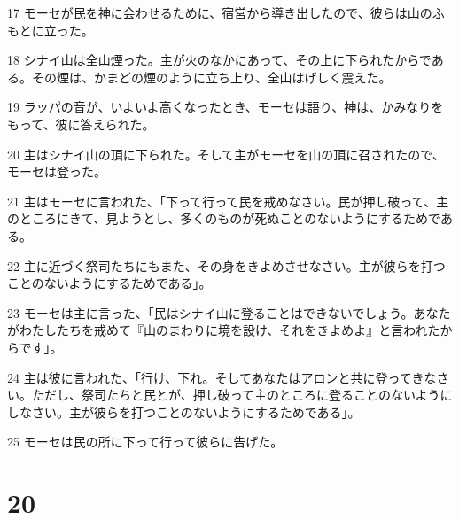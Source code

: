\par 17 モーセが民を神に会わせるために、宿営から導き出したので、彼らは山のふもとに立った。
\par 18 シナイ山は全山煙った。主が火のなかにあって、その上に下られたからである。その煙は、かまどの煙のように立ち上り、全山はげしく震えた。
\par 19 ラッパの音が、いよいよ高くなったとき、モーセは語り、神は、かみなりをもって、彼に答えられた。
\par 20 主はシナイ山の頂に下られた。そして主がモーセを山の頂に召されたので、モーセは登った。
\par 21 主はモーセに言われた、「下って行って民を戒めなさい。民が押し破って、主のところにきて、見ようとし、多くのものが死ぬことのないようにするためである。
\par 22 主に近づく祭司たちにもまた、その身をきよめさせなさい。主が彼らを打つことのないようにするためである」。
\par 23 モーセは主に言った、「民はシナイ山に登ることはできないでしょう。あなたがわたしたちを戒めて『山のまわりに境を設け、それをきよめよ』と言われたからです」。
\par 24 主は彼に言われた、「行け、下れ。そしてあなたはアロンと共に登ってきなさい。ただし、祭司たちと民とが、押し破って主のところに登ることのないようにしなさい。主が彼らを打つことのないようにするためである」。
\par 25 モーセは民の所に下って行って彼らに告げた。

\chapter{20}


